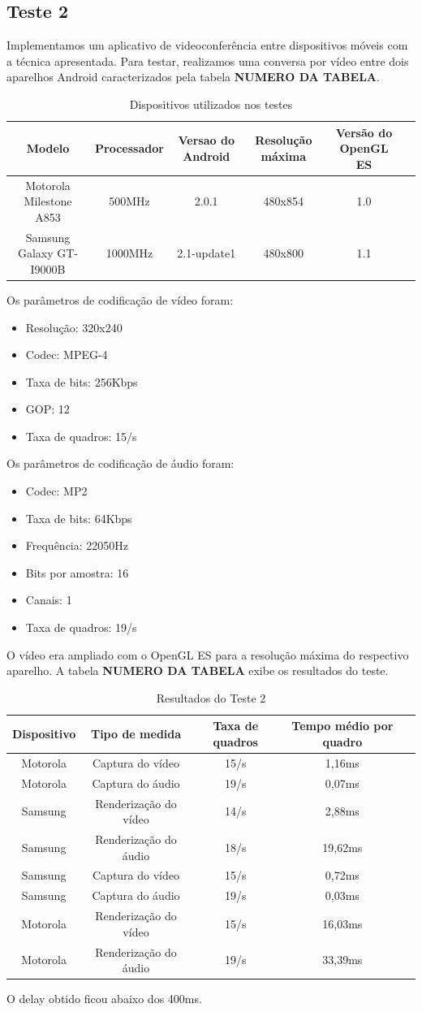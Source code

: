 \documentclass{acm_proc_article-sp}
\newcommand{\todo}[1]{\textcolor[rgb]{1.00,0.00,0.00}{\bf \uppercase{#1}}}
\begin{document}
\subsection{Teste 2}
Implementamos um aplicativo de videoconferência entre dispositivos móveis com a técnica apresentada. Para testar, realizamos uma conversa por vídeo entre dois aparelhos Android caracterizados pela tabela \todo{numero da tabela}.
\begin{table}
\centering
\caption{Dispositivos utilizados nos testes}
\begin{tabular}{|c|c|c|c|c|l} \hline
Modelo&Processador&Versao do Android&Resolução máxima&Versão do OpenGL ES\\ \hline
Motorola Milestone A853&500MHz&2.0.1&480x854&1.0\\ \hline
Samsung Galaxy GT-I9000B&1000MHz&2.1-update1&480x800&1.1\\
\hline\end{tabular}
\end{table}
Os parâmetros de codificação de vídeo foram:
\begin{itemize}
 \item Resolução: 320x240
 \item Codec: MPEG-4
 \item Taxa de bits: 256Kbps
 \item GOP: 12
 \item Taxa de quadros: 15/s
\end{itemize}
Os parâmetros de codificação de áudio foram:
\begin{itemize}
 \item Codec: MP2
 \item Taxa de bits: 64Kbps
 \item Frequência: 22050Hz
 \item Bits por amostra: 16
 \item Canais: 1
 \item Taxa de quadros: 19/s
\end{itemize}
O vídeo era ampliado com o OpenGL ES para a resolução máxima do respectivo aparelho. A tabela \todo{numero da tabela} exibe os resultados do teste.
\begin{table}
\centering
\caption{Resultados do Teste 2}
\begin{tabular}{|c|c|c|c|l} \hline
Dispositivo&Tipo de medida&Taxa de quadros&Tempo médio por quadro\\ \hline
Motorola&Captura do vídeo&15/s&1,16ms\\ \hline
Motorola&Captura do áudio&19/s&0,07ms\\ \hline
Samsung&Renderização do vídeo&14/s&2,88ms\\ \hline
Samsung&Renderização do áudio&18/s&19,62ms\\ \hline
Samsung&Captura do vídeo&15/s&0,72ms\\ \hline
Samsung&Captura do áudio&19/s&0,03ms\\ \hline
Motorola&Renderização do vídeo&15/s&16,03ms\\ \hline
Motorola&Renderização do áudio&19/s&33,39ms\\
\hline\end{tabular}
\end{table}
O delay obtido ficou abaixo dos 400ms.
\end{document}
